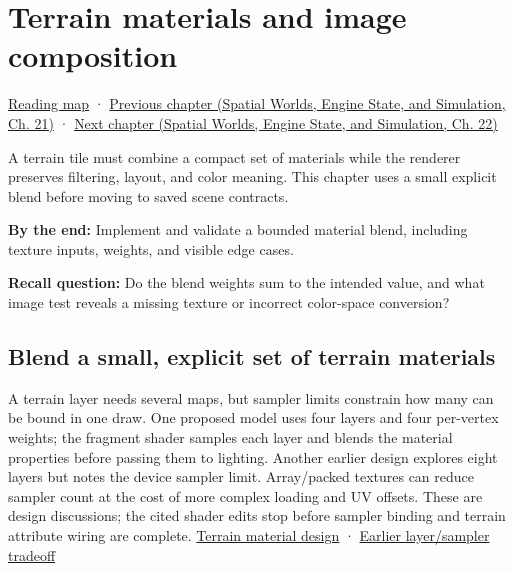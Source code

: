 \chapter{Terrain materials and image composition}\label{06-engine-ii-ch032-terrain-materials-and-image-composition}\hypertarget{06-engine-ii-ch032}{}\label{stagechapter:06-engine-ii-ch032}

\hyperref[volume-reading-map]{Reading map} · \href{../05-Spatial-Worlds-Engine-State-and-Simulation/main.pdf\#nameddest=06-engine-ii-ch031-spatial-index-serialization-and-query-evidence}{Previous chapter (Spatial Worlds, Engine State, and Simulation, Ch. 21)} · \href{../05-Spatial-Worlds-Engine-State-and-Simulation/main.pdf\#nameddest=06-engine-ii-ch033-versioned-scenes-and-transactional-loading}{Next chapter (Spatial Worlds, Engine State, and Simulation, Ch. 22)}

A terrain tile must combine a compact set of materials while the renderer preserves filtering, layout, and color meaning. This chapter uses a small explicit blend before moving to saved scene contracts.

\textbf{By the end:} Implement and validate a bounded material blend, including texture inputs, weights, and visible edge cases.

\textbf{Recall question:} Do the blend weights sum to the intended value, and what image test reveals a missing texture or incorrect color-space conversion?

\section{Blend a small, explicit set of terrain materials}\label{06-engine-ii-ch032-blend-a-small-explicit-set-of-terrain-materials}

A terrain layer needs several maps, but sampler limits constrain how many can be bound in one draw. One proposed model uses four layers and four per-vertex weights; the fragment shader samples each layer and blends the material properties before passing them to lighting. Another earlier design explores eight layers but notes the device sampler limit. Array/packed textures can reduce sampler count at the cost of more complex loading and UV offsets. These are design discussions; the cited shader edits stop before sampler binding and terrain attribute wiring are complete. \href{https://www.youtube.com/watch?v=vLzvpFaX50A}{Terrain material design} · \href{https://www.youtube.com/watch?v=unypFSvg7gI}{Earlier layer/sampler tradeoff}

